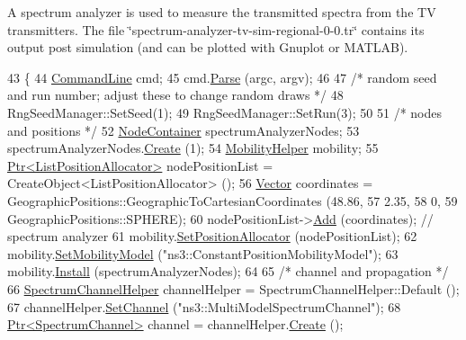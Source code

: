 A spectrum analyzer is used to measure the transmitted spectra from the TV transmitters. The file \char`\"{}spectrum-\/analyzer-\/tv-\/sim-\/regional-\/0-\/0.\+tr\char`\"{} contains its output post simulation (and can be plotted with Gnuplot or M\+A\+T\+L\+AB). 
\begin{DoxyCode}
43 \{
44   \hyperlink{classns3_1_1CommandLine}{CommandLine} cmd;
45   cmd.\hyperlink{classns3_1_1CommandLine_a5c10b85b3207e5ecb48d907966923156}{Parse} (argc, argv);
46   
47   \textcolor{comment}{/* random seed and run number; adjust these to change random draws */}
48   RngSeedManager::SetSeed(1);
49   RngSeedManager::SetRun(3);
50 
51   \textcolor{comment}{/* nodes and positions */}
52   \hyperlink{classns3_1_1NodeContainer}{NodeContainer} spectrumAnalyzerNodes;
53   spectrumAnalyzerNodes.\hyperlink{classns3_1_1NodeContainer_a787f059e2813e8b951cc6914d11dfe69}{Create} (1);
54   \hyperlink{classns3_1_1MobilityHelper}{MobilityHelper} mobility;
55   \hyperlink{classns3_1_1Ptr}{Ptr<ListPositionAllocator>} nodePositionList = 
      CreateObject<ListPositionAllocator> ();
56   \hyperlink{classns3_1_1Vector3D_a7e59b47bc94c9cb1dadff68c1d0112d8}{Vector} coordinates = GeographicPositions::GeographicToCartesianCoordinates (48.86, 
57                                                                               2.35, 
58                                                                               0,
59                                                                               GeographicPositions::SPHERE);
60   nodePositionList->\hyperlink{classns3_1_1ListPositionAllocator_a460e82f015ac012a73ba0ea0cccb3486}{Add} (coordinates); \textcolor{comment}{// spectrum analyzer}
61   mobility.\hyperlink{classns3_1_1MobilityHelper_ac59d5295076be3cc11021566713a28c5}{SetPositionAllocator} (nodePositionList);
62   mobility.\hyperlink{classns3_1_1MobilityHelper_a030275011b6f40682e70534d30280aba}{SetMobilityModel} (\textcolor{stringliteral}{"ns3::ConstantPositionMobilityModel"});
63   mobility.\hyperlink{classns3_1_1MobilityHelper_a07737960ee95c0777109cf2994dd97ae}{Install} (spectrumAnalyzerNodes);
64 
65   \textcolor{comment}{/* channel and propagation */}
66   \hyperlink{classns3_1_1SpectrumChannelHelper}{SpectrumChannelHelper} channelHelper = SpectrumChannelHelper::Default ();
67   channelHelper.\hyperlink{classns3_1_1SpectrumChannelHelper_a11ffe86edea8cdd30f181e41c0e3e29f}{SetChannel} (\textcolor{stringliteral}{"ns3::MultiModelSpectrumChannel"});
68   \hyperlink{classns3_1_1Ptr}{Ptr<SpectrumChannel>} channel = channelHelper.\hyperlink{classns3_1_1SpectrumChannelHelper_a419ea84f5046763085f94f38af319fb9}{Create} ();

\end{DoxyCode}
